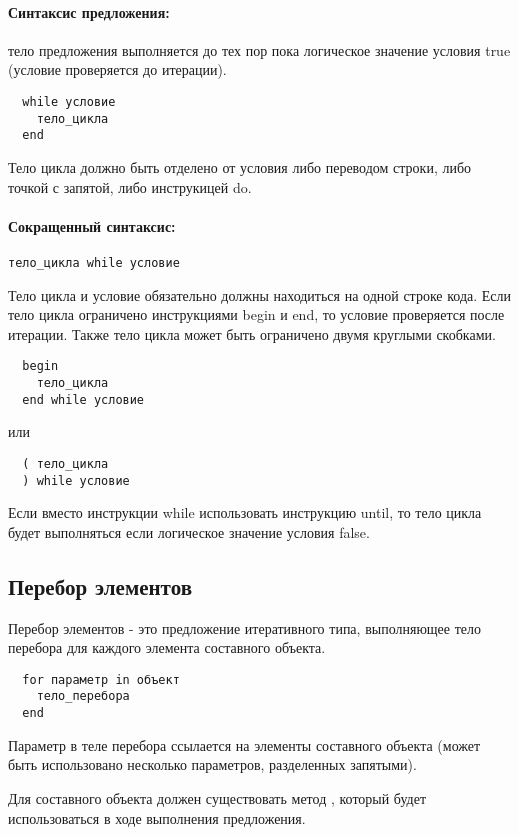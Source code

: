 \paragraph*{Синтаксис предложения:} тело предложения выполняется до тех пор пока логическое значение условия true (условие проверяется до итерации).

\begin{verbatim}
  while условие
    тело_цикла
  end
\end{verbatim}

Тело цикла должно быть отделено от условия либо переводом строки, либо точкой с запятой, либо инструкицей do.

\paragraph*{Сокращенный синтаксис:} \verb!тело_цикла while условие!

Тело цикла и условие обязательно должны находиться на одной строке кода. Если тело цикла ограничено инструкциями begin и end, то условие проверяется после итерации. Также тело цикла может быть ограничено двумя круглыми скобками.
\begin{verbatim}
  begin 
    тело_цикла
  end while условие
\end{verbatim}
или
\begin{verbatim}
  ( тело_цикла
  ) while условие
\end{verbatim}
	
Если вместо инструкции while использовать инструкцию until, то тело цикла будет выполняться если логическое значение условия false. 

\subsection{Перебор элементов}

Перебор элементов - это предложение итеративного типа, выполняющее тело перебора для каждого элемента составного объекта.
\begin{verbatim}
  for параметр in объект
    тело_перебора
  end
\end{verbatim}

Параметр в теле перебора ссылается на элементы составного объекта (может быть использовано несколько параметров, разделенных запятыми).

Для составного объекта должен существовать метод , который будет использоваться в ходе выполнения предложения.

